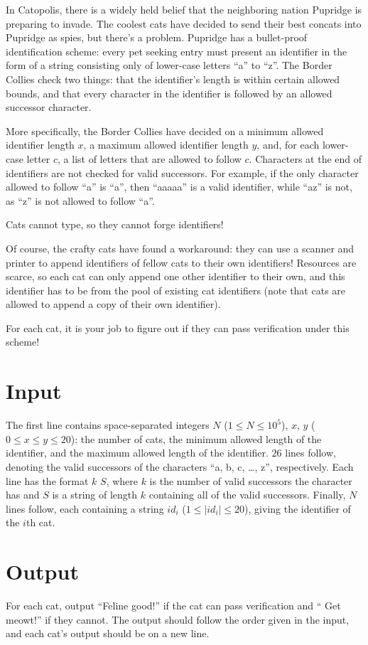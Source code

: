 
In Catopolis, there is a widely held belief that the neighboring nation Pupridge is preparing to invade.
The coolest cats have decided to send their best concats into Pupridge as spies, but there's a problem.
Pupridge has a bullet-proof identification scheme: every pet seeking entry must present an identifier in
the form of a string consisting only of lower-case letters ``a'' to ``z''.
The Border Collies check two things: that the identifier's length is within certain allowed bounds, and that 
every character in the identifier is followed by an allowed successor character. 

More specifically, the Border Collies have decided on a minimum allowed identifier length $x$, a maximum
allowed identifier length $y$, and, for each lower-case letter $c$, a list of letters that are allowed
to follow $c$. Characters at the end of identifiers are not checked for valid successors.
For example, if the only character allowed to follow ``a'' is ``a'', then ``aaaaa'' is a valid identifier,
while ``az'' is not, as ``z'' is not allowed to follow ``a''.

Cats cannot type, so they cannot forge identifiers!


\medskip

Of course, the crafty cats have found a workaround: they can use a scanner and printer to append identifiers 
of fellow cats to their own identifiers! Resources are scarce, so each cat can only append one other
identifier to their own, and this identifier has to be from the pool of existing cat identifiers (note that
cats are allowed to append a copy of their own identifier).

\medskip

For each cat, it is your job to figure out if they can pass verification under this scheme!

\section*{Input}
The first line contains space-separated integers $N$ ($1 \leq N \leq 10^5$), $x$, $y$
($0 \leq x \leq y \leq 20$): the number of cats, the minimum allowed length of the identifier, and the
maximum allowed length of the identifier.
$26$ lines follow, denoting the valid successors of the characters ``a, b, c, \ldots, z'', respectively.
Each line has the format $k$ $S$, where $k$ is the number of valid successors the character has and $S$ is a
string of length $k$ containing all of the valid successors.
Finally, $N$ lines follow, each containing a string $id_i$ ($1 \leq |id_i| \leq 20$), giving the identifier
of the $i$th cat.

\section*{Output}
For each cat, output ``Feline good!'' if the cat can pass verification and  `` Get meowt!'' if they cannot.
The output should follow the order given in the input, and each cat's output should be on a new line.
